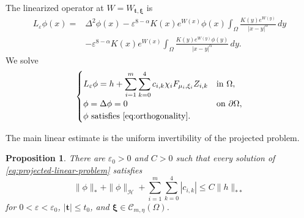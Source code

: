 \documentclass[11pt]{article}
\newtheorem{proposition}[theorem]{Proposition}
\numberwithin{equation}{section}
\begin{document}
The linearized operator at $W=W_{\boldsymbol t,\boldsymbol\xi}$ is
\begin{equation}\label{eq:linearized-W}
\begin{aligned}
L_\varepsilon\phi(x)
={}&\Delta^2\phi(x)
-\varepsilon^{8-\alpha}K(x)e^{W(x)}\phi(x)
\int_\Omega\frac{K(y)e^{W(y)}}{|x-y|^\alpha}\,dy\\
&-\varepsilon^{8-\alpha}K(x)e^{W(x)}
\int_\Omega\frac{K(y)e^{W(y)}\phi(y)}{|x-y|^\alpha}\,dy.
\end{aligned}
\end{equation}
We solve
\begin{equation}\label{eq:projected-linear-problem}
\begin{cases}
\displaystyle
L_\varepsilon\phi
=h+\displaystyle\sum_{i=1}^{m}\sum_{k=0}^{4}
 c_{i,k}\chi_iF_{\mu_i,\xi_i}Z_{i,k}
&\text{in }\Omega,\\
\phi=\Delta\phi=0&\text{on }\partial\Omega,\\
\phi\text{ satisfies }\eqref{eq:orthogonality}.&
\end{cases}
\end{equation}

The main linear estimate is the uniform invertibility of the projected problem.

\begin{proposition}\label{prop:linear-estimate}
There are $\varepsilon_0>0$ and $C>0$ such that every solution of
\eqref{eq:projected-linear-problem} satisfies
\begin{equation}\label{eq:linear-estimate}
\|\phi\|_*+\|\phi\|_\mathcal H
+\sum_{i=1}^{m}\sum_{k=0}^{4}|c_{i,k}|
\leq C\|h\|_{**}
\end{equation}
for $0<\varepsilon<\varepsilon_0$, $|\boldsymbol t|\leq t_0$, and
$\boldsymbol\xi\in\mathcal C_{m,\eta}(\Omega)$.
\end{proposition}
\end{document}
